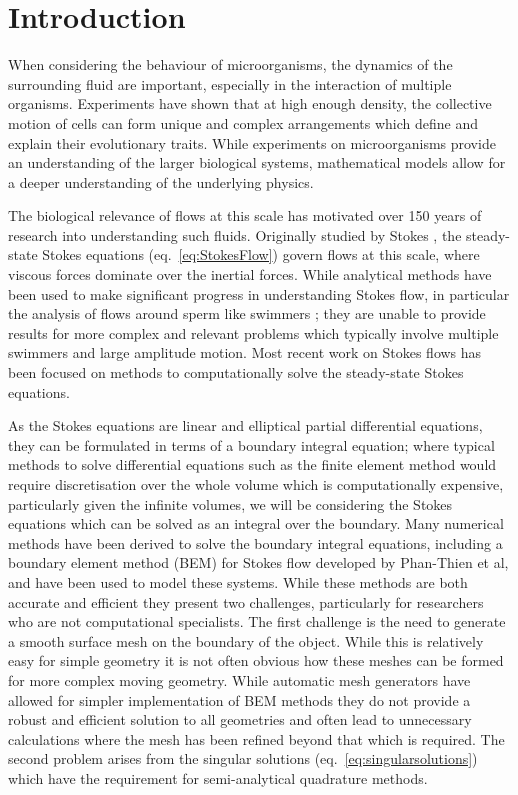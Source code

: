 \section{Introduction}
When considering the behaviour of microorganisms, the dynamics of the surrounding fluid are important, especially in the interaction of multiple organisms. Experiments have shown that at high enough density, the collective motion of cells can form unique and complex arrangements which define and explain their evolutionary traits. While experiments on microorganisms provide an understanding of the larger biological systems, mathematical models allow for a deeper understanding of the underlying physics. 

The biological relevance of flows at this scale has motivated over 150 years of research into understanding such fluids. Originally studied by Stokes \cite{Stokes2010OnPendulums}, the steady-state Stokes equations (eq.~\ref{eq:StokesFlow}) govern flows at this scale, where viscous forces dominate over the inertial forces. While analytical methods have been used to make significant progress in understanding Stokes flow, in particular the analysis of flows around sperm like swimmers \cite{Hancock1953TheLiquids,GRAY1955TheSpermatozoa,Taylor1951AnalysisOrganisms}; they are unable to provide results for more complex and relevant problems which typically involve multiple swimmers and large amplitude motion. Most recent work on Stokes flows has been focused on methods to computationally solve the steady-state Stokes equations. 

As the Stokes equations are linear and elliptical partial differential equations, they can be formulated in terms of a boundary integral equation; where typical methods to solve differential equations such as the finite element method would require discretisation over the whole volume which is computationally expensive, particularly given the infinite volumes, we will be considering the Stokes equations which can be solved as an integral over the boundary. Many numerical methods have been derived to solve the boundary integral equations, including a boundary element method (BEM) for Stokes flow developed by Phan-Thien et al\cite{Tran-Cong1987APropulsion}, and have been used to model these systems. While these methods are both accurate and efficient they present two challenges, particularly for researchers who are not computational specialists. The first challenge is the need to generate a smooth surface mesh on the boundary of the object. While this is relatively easy for simple geometry it is not often obvious how these meshes can be formed for more complex moving geometry. While automatic mesh generators have allowed for simpler implementation of BEM methods they do not provide a robust and efficient solution to all geometries and often lead to unnecessary calculations where the mesh has been refined beyond that which is required. The second problem arises from the singular solutions (eq.~\ref{eq:singularsolutions}) which have the requirement for semi-analytical quadrature methods.

